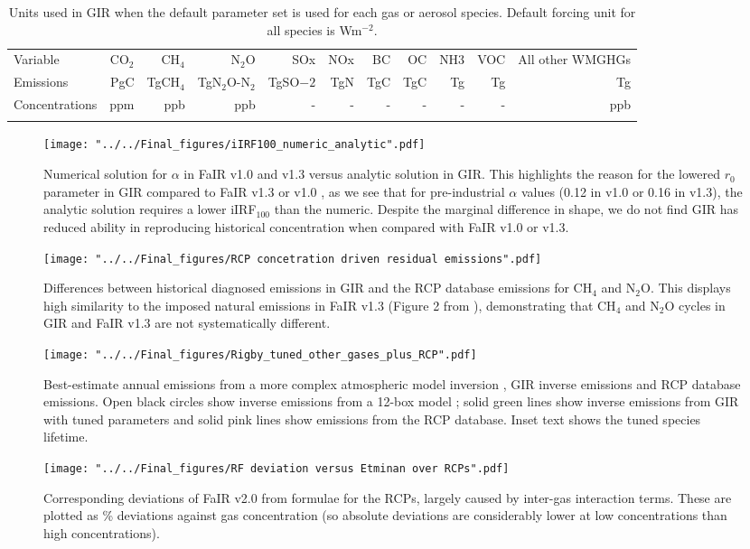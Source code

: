 \documentclass[gmd, manuscript]{copernicus}
\begin{document}
\begin{table}[t]
    \caption{Units used in GIR when the default parameter set is used for each gas or aerosol species. Default forcing unit for all species is Wm$^{-2}$.} \label{tab:units}
    \begin{tabular}{l r r r r r r r r r r}
    \tophline
    Variable & CO$_2$ & CH$_4$ & N$_2$O & SOx & NOx & BC & OC & NH3 & VOC & All other WMGHGs\\
    \middlehline
    Emissions & PgC & TgCH$_4$ & TgN$_2$O-N$_2$ & TgSO$-2$ & TgN & TgC & TgC & Tg & Tg & Tg  \\
    Concentrations & ppm & ppb & ppb & - & - & - & - & - & - & ppb \\
    \bottomhline
    \end{tabular}
    \belowtable{} %
\end{table}
\clearpage
\begin{figure}[t]
    \texttt{[image: "../../Final\_figures/iIRF100\_numeric\_analytic".pdf]}
    \caption{Numerical solution for $\alpha$ in FaIR v1.0 and v1.3 versus analytic solution in GIR. This highlights the reason for the lowered $r_0$ parameter in GIR compared to FaIR v1.3 \citep{Smith2017} or v1.0 \citep{Millar2016}, as we see that for pre-industrial $\alpha$ values (0.12 in v1.0 or 0.16 in v1.3), the analytic solution requires a lower iIRF$_{100}$ than the numeric. Despite the marginal difference in shape, we do not find GIR has reduced ability in reproducing historical concentration when compared with FaIR v1.0 or v1.3.}
\end{figure}
\clearpage
\begin{figure}[t]
    \texttt{[image: "../../Final\_figures/RCP concetration driven residual emissions".pdf]}
    \caption{Differences between historical diagnosed emissions in GIR and the RCP database emissions for CH$_4$ and N$_2$O. This displays high similarity to the imposed natural emissions in FaIR v1.3 (Figure 2 from \cite{Smith2017}), demonstrating that CH$_4$ and N$_2$O cycles in GIR and FaIR v1.3 are not systematically different.}
\end{figure}
\clearpage
\begin{figure}[t]
    \texttt{[image: "../../Final\_figures/Rigby\_tuned\_other\_gases\_plus\_RCP".pdf]}
    \caption{Best-estimate annual emissions from a more complex atmospheric model inversion \cite{Rigby2014}, GIR inverse emissions and RCP database emissions. Open black circles show inverse emissions from a 12-box model \cite{Cunnold1994}; solid green lines show inverse emissions from GIR with tuned parameters and solid pink lines show emissions from the RCP database. Inset text shows the tuned species lifetime.}
\end{figure}
\clearpage
\begin{figure}[t]
    \texttt{[image: "../../Final\_figures/RF deviation versus Etminan over RCPs".pdf]}
    \caption{Corresponding deviations of FaIR v2.0 from \cite{Etminan2016} formulae for the RCPs, largely caused by inter-gas interaction terms. These are plotted as \% deviations against gas concentration (so absolute deviations are considerably lower at low concentrations than high concentrations).}
\end{figure}
\clearpage
\end{document}
